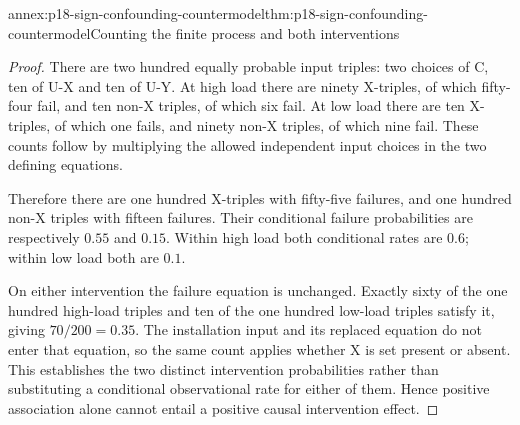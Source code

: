 \begin{annexitem}{annex:p18-sign-confounding-countermodel}{thm:p18-sign-confounding-countermodel}{Counting the finite process and both interventions}
\begin{proof}
There are two hundred equally probable input triples: two choices of C,
ten of U-X and ten of U-Y. At high load there are ninety X-triples,
of which fifty-four fail, and ten non-X triples, of which six fail.
At low load there are ten X-triples, of which one fails, and ninety
non-X triples, of which nine fail. These counts follow by multiplying
the allowed independent input choices in the two defining equations.

Therefore there are one hundred X-triples with fifty-five failures,
and one hundred non-X triples with fifteen failures. Their conditional
failure probabilities are respectively \(0.55\) and \(0.15\). Within high
load both conditional rates are \(0.6\); within low load both are \(0.1\).

On either intervention the failure equation is unchanged. Exactly sixty
of the one hundred high-load triples and ten of the one hundred low-load
triples satisfy it, giving \(70/200=0.35\). The installation input and its
replaced equation do not enter that equation, so the same count applies
whether X is set present or absent. This establishes the two distinct
intervention probabilities rather than substituting a conditional
observational rate for either of them. Hence positive association alone
cannot entail a positive causal intervention effect.
\end{proof}
\end{annexitem}
